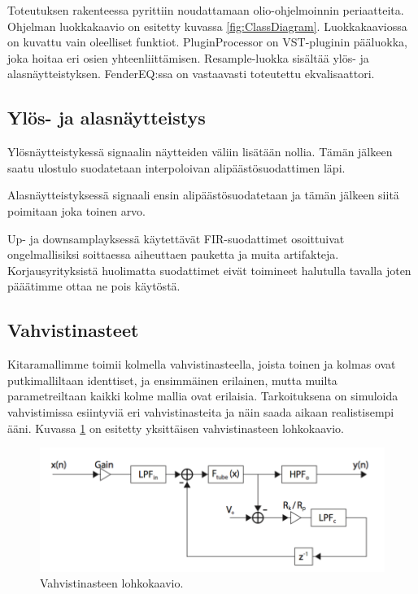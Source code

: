 \documentclass[11pt, a4paper, oneside]{article}
\begin{document}
	Toteutuksen rakenteessa pyrittiin noudattamaan olio-ohjelmoinnin periaatteita. Ohjelman luokkakaavio on esitetty kuvassa \ref{fig:ClassDiagram}. Luokkakaaviossa on kuvattu vain oleelliset funktiot. PluginProcessor on VST-pluginin pääluokka, joka hoitaa eri osien yhteenliittämisen. Resample-luokka sisältää ylös- ja alasnäytteistyksen. FenderEQ:ssa on vastaavasti toteutettu ekvalisaattori. 
 
 \subsection{Ylös- ja alasnäytteistys}
 
Ylösnäytteistykessä signaalin näytteiden väliin lisätään nollia. Tämän jälkeen saatu ulostulo suodatetaan interpoloivan alipäästösuodattimen läpi.

Alasnäytteistyksessä signaali ensin alipäästösuodatetaan ja tämän jälkeen siitä poimitaan joka toinen arvo.

Up- ja downsamplayksessä käytettävät FIR-suodattimet osoittuivat ongelmallisiksi soittaessa aiheuttaen pauketta ja muita artifakteja. Korjausyrityksistä huolimatta suodattimet eivät toimineet halutulla tavalla joten pääätimme ottaa ne pois käytöstä. 



	

 \subsection{Vahvistinasteet}
 
 Kitaramallimme toimii kolmella vahvistinasteella, joista toinen ja kolmas ovat putkimalliltaan identtiset, ja ensimmäinen erilainen, mutta muilta parametreiltaan kaikki kolme mallia ovat erilaisia.
 Tarkoituksena on simuloida vahvistimissa esiintyviä eri vahvistinasteita ja näin saada aikaan realistisempi ääni.
 Kuvassa \ref{fig:drive} on esitetty yksittäisen vahvistinasteen lohkokaavio. 
 
\begin{figure}[h!]
\includegraphics[width=1\textwidth, center]{drive.png} \newline
\caption{Vahvistinasteen lohkokaavio.}
\label{fig:drive}
\end{figure}
\end{document}
